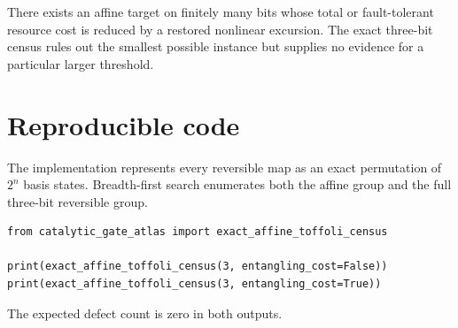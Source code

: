 \begin{conjecturebox}
There exists an affine target on finitely many bits whose total or fault-tolerant resource cost is reduced by a restored nonlinear excursion.  The exact three-bit census rules out the smallest possible instance but supplies no evidence for a particular larger threshold.
\end{conjecturebox}

\section{Reproducible code}
The implementation represents every reversible map as an exact permutation of $2^n$ basis states.  Breadth-first search enumerates both the affine group and the full three-bit reversible group.

\begin{lstlisting}[style=pythonstyle,caption={Exact three-bit affine-versus-Toffoli census.}]
from catalytic_gate_atlas import exact_affine_toffoli_census

print(exact_affine_toffoli_census(3, entangling_cost=False))
print(exact_affine_toffoli_census(3, entangling_cost=True))
\end{lstlisting}
The expected defect count is zero in both outputs.
